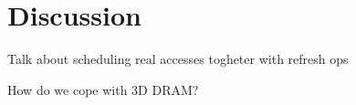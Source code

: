 \section{Discussion} 
\label{sec:disc}

Talk about scheduling real accesses togheter with refresh ops

How do we cope with 3D DRAM?